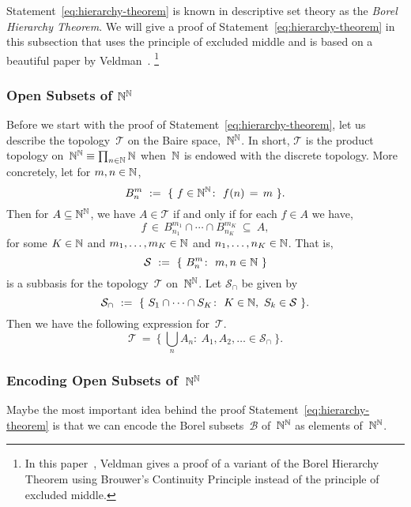 \documentclass[main.tex]{subfiles}
\begin{document}
Statement~\eqref{eq:hierarchy-theorem}
is known in descriptive set theory
as the \emph{Borel Hierarchy Theorem}.
We will give a proof of Statement~\eqref{eq:hierarchy-theorem}
 in this subsection that
uses the principle of excluded middle
and is based on a beautiful paper by Veldman~\cite[paragraph 5]{Veldman08}.%
\footnote{
In this paper~\cite{Veldman08},
Veldman gives
a proof of a variant of the Borel Hierarchy Theorem
using Brouwer's Continuity Principle
instead of the principle of excluded middle.}

\subsubsection{Open Subsets of $\mathbb{N}^{\mathbb{N}}$}$\,$\\
Before we start with the proof of Statement~\eqref{eq:hierarchy-theorem},
let us describe the topology~$\mathcal{T}$ on the Baire space,~$\mathbb{N}^{\mathbb{N}}$.
In short, $\mathcal{T}$ is the product topology 
on~$\mathbb{N}^{\mathbb{N}} \equiv \prod_{n\in\mathbb{N}} \mathbb{N}$
when~$\mathbb{N}$ is endowed with the discrete topology.
More concretely, let for $m,n\in\mathbb{N}$,
\begin{equation*}
B_n^m\ :=\ \{ \ f\in\mathbb{N}^{\mathbb{N}}\colon\  f(n) \,=\, m \ \}.
\end{equation*}
Then for $A\subseteq \mathbb{N}^{\mathbb{N}}$,
we have $A\in \mathcal{T}$
if and only if for each $f\in A$
we have,
\begin{equation*}
f\,\in\, B^{m_1}_{n_1} \cap \dotsb \cap B^{m_K}_{n_K} \ \subseteq\ A,
\end{equation*}
for some $K\in\mathbb{N}$ and $m_1,\dotsc,m_K\in\mathbb{N}$
and $n_1,\dotsc,n_K\in\mathbb{N}$.
That is,
\begin{equation*}
\mathcal{S} \ \eqdf\ 
\{\ B^m_n \colon \ m,n\in\N \ \}
\end{equation*}
is a subbasis for the topology~$\mathcal{T}$ on~$\mathbb{N}^{\mathbb{N}}$.
Let $\mathcal{S}_\cap$ be given by
\begin{equation}
\label{eq:expression-s-cap}
\mathcal{S}_\cap \ \eqdf \ 
\{ \ S_1 \cap \dotsb\cap S_K\colon\ 
K\in\N,\  S_k\in \mathcal{S}\ \}.
\end{equation}
Then we have the following expression for~$\mathcal{T}$.
\begin{equation}
\label{eq:expression-t}
\mathcal{T}\ =\ 
\{\ \textstyle{\bigcup_n} A_n\colon \ A_1,A_2,\dotsc \in \mathcal{S}_\cap\ \}.
\end{equation}

\subsubsection{Encoding Open Subsets of~$\mathbb{N}^{\mathbb{N}}$}$\,$\\
Maybe the most important idea behind the proof
 Statement~\eqref{eq:hierarchy-theorem}
is that 
we can
encode the  Borel subsets~$\mathcal{B}$ of~$\mathbb{N}^{\mathbb{N}}$
as elements of~$\mathbb{N}^{\mathbb{N}}$.
\end{document}
